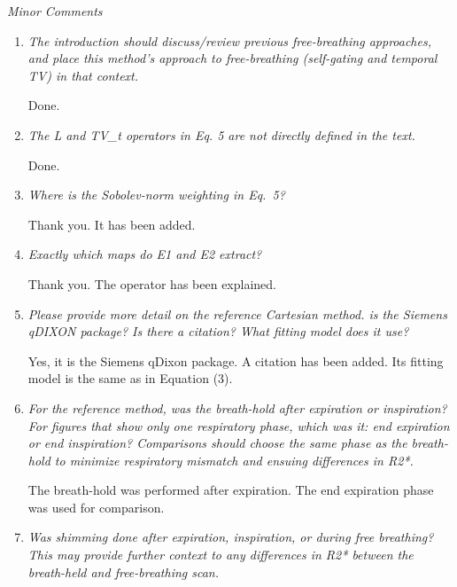 \documentclass[a4paper,11pt]{report}
\begin{document}
\noindent \textit{Minor Comments}

\begin{enumerate}[resume]
	\item \textit{The introduction should discuss/review previous free-breathing approaches, and place this method's approach to free-breathing (self-gating and temporal TV) in that context.}

\hspace{1em} Done.

	\item \textit{The L and TV\_t operators in Eq. 5 are not directly defined in the text.}

\hspace{1em} Done.

	\item \textit{Where is the Sobolev-norm weighting in Eq.~5?}

\hspace{1em} Thank you. It has been added.

	\item \textit{Exactly which maps do E1 and E2 extract?}

\hspace{1em} Thank you. The operator has been explained.

	\item \textit{Please provide more detail on the reference Cartesian method. is the Siemens qDIXON package? Is there a citation? What fitting model does it use?}

\hspace{1em} Yes, it is the Siemens qDixon package. A citation has been added. 
Its fitting model is the same as in Equation (3).

	\item \textit{For the reference method, was the breath-hold after expiration or inspiration? For figures that show only one respiratory phase, which was it: end expiration or end inspiration? Comparisons should choose the same phase as the breath-hold to minimize respiratory mismatch and ensuing differences in R2*.}

\hspace{1em} The breath-hold was performed after expiration. 
The end expiration phase was used for comparison.

	\item \textit{Was shimming done after expiration, inspiration, or during free breathing? This may provide further context to any differences in R2* between the breath-held and free-breathing scan.}


\end{enumerate}
\end{document}
